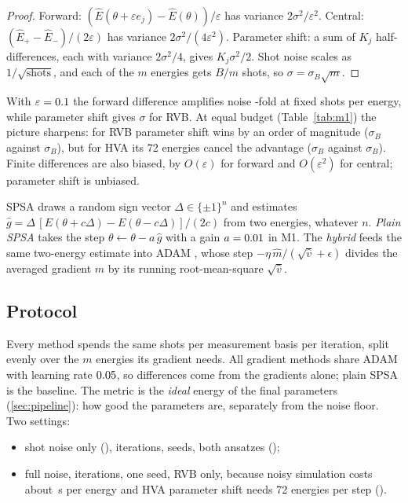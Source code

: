 \begin{proof}
  Forward: $(\hat E(\theta+\varepsilon e_j)-\hat E(\theta))/\varepsilon$ has variance
  $2\sigma^2/\varepsilon^2$. Central: $(\hat E_+-\hat E_-)/(2\varepsilon)$ has variance
  $2\sigma^2/(4\varepsilon^2)$. Parameter shift: a sum of $K_j$ half-differences, each with variance
  $2\sigma^2/4$, gives $K_j\sigma^2/2$. Shot noise scales as $1/\sqrt{\text{shots}}$, and each
  of the $m$ energies gets $B/m$ shots, so $\sigma=\sigma_B\sqrt m$.
\end{proof}

With $\varepsilon=0.1$ the forward difference amplifies noise \VSigmaFwd-fold at fixed shots
per energy, while parameter shift gives \VSigmaPsRvb$\sigma$ for RVB. At equal budget
(Table~\ref{tab:m1}) the picture sharpens: for RVB parameter shift wins by an order of magnitude
(\VBudgetPsRvb$\sigma_B$ against \VBudgetFwdRvb$\sigma_B$), but for HVA its 72 energies cancel the
advantage (\VBudgetPsHva$\sigma_B$ against \VBudgetFwdHva$\sigma_B$). Finite differences are
also biased, by $O(\varepsilon)$ for forward and $O(\varepsilon^2)$ for central; parameter shift is
unbiased.

\begin{dfn}
  SPSA \parencite{spall1992} draws a random sign vector $\Delta\in\{\pm1\}^n$ and estimates
  $\hat g=\Delta\,[E(\theta+c\Delta)-E(\theta-c\Delta)]/(2c)$ from two energies, whatever $n$.
  \emph{Plain SPSA} takes the step $\theta\leftarrow\theta-a\,\hat g$ with a \VSpsaCalibrated{}
  gain $a=0.01$ in M1. The \emph{hybrid} feeds the same two-energy estimate into ADAM
  \parencite{kingma2014}, whose step $-\eta\,\hat m/(\sqrt{\hat v}+\epsilon)$ divides the averaged
  gradient $\hat m$ by its running root-mean-square $\sqrt{\hat v}$.
\end{dfn}

\subsection{Protocol}

Every method spends the same \VMBudget{} shots per measurement basis per iteration, split evenly
over the $m$ energies its gradient needs. All gradient methods share ADAM with learning rate
$0.05$, so differences come from the gradients alone; plain SPSA is the baseline. The metric
is the \emph{ideal} energy of the final parameters (\cref{sec:pipeline}): how good the parameters
are, separately from the noise floor. Two settings:
\begin{itemize}
  \item shot noise only (), \VMItersHva{} iterations, \VMSeeds{} seeds, both
    ansatzes ();
  \item full  noise, \VMNoisyIters{} iterations, one seed, RVB only, because
    noisy simulation costs about \VSecPerEnergy{}\,s per energy and HVA parameter shift needs 72
    energies per step ().
\end{itemize}

